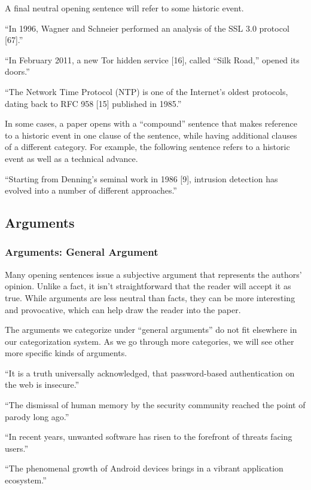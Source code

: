 \documentclass[sigconf]{acmart}
\begin{document}
	A final neutral opening sentence will refer to some historic event. 
	
	``In 1996, Wagner and Schneier performed an analysis of the SSL 3.0 protocol [67].''
	
	``In February 2011, a new Tor hidden service [16], called “Silk Road,” opened its doors.''
	
	``The Network Time Protocol (NTP) is one of the Internet’s oldest protocols, dating back to RFC 958 [15] published in 1985.''
	
	In some cases, a paper opens with a “compound” sentence that makes reference to a historic event in one clause of the sentence, while having additional clauses of a different category. For example, the following sentence refers to a historic event as well as a technical advance.
	
	``Starting from Denning’s seminal work in 1986 [9], intrusion detection has evolved into a number of different approaches.''
	
	\subsection{Arguments}
	\subsubsection{Arguments: General Argument}
	
	Many opening sentences issue a subjective argument that represents the authors’ opinion. Unlike a fact, it isn’t straightforward that the reader will accept it as true. While arguments are less neutral than facts, they can be more interesting and provocative, which can help draw the reader into the paper.
	
	The arguments we categorize under “general arguments” do not fit elsewhere in our categorization system. As we go through more categories, we will see other more specific kinds of arguments. 
	
	``It is a truth universally acknowledged, that password-based authentication on the web is insecure.''
	
	``The dismissal of human memory by the security community reached the point of parody long ago.''
	
	``In recent years, unwanted software has risen to the forefront of threats facing users.''
	
	``The phenomenal growth of Android devices brings in a vibrant application ecosystem.''
	
\end{document}
